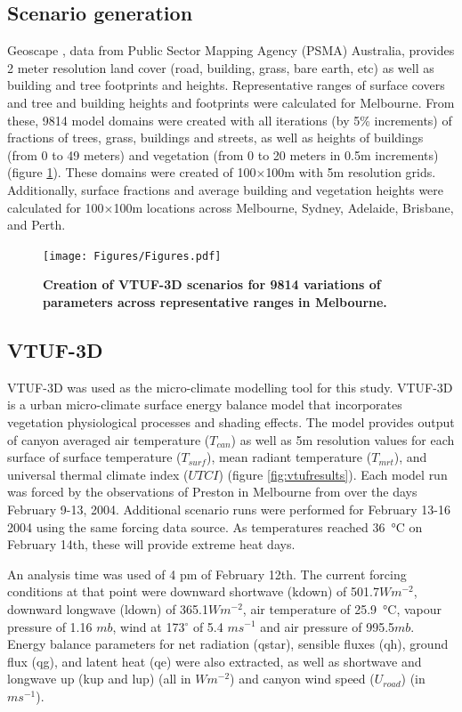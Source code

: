 \documentclass[final,3p,times,authoryear]{elsarticle}
\begin{document}
\subsection{Scenario generation}\label{sec:methodsgen}
Geoscape \citep{Geoscape2020}, data from Public Sector Mapping Agency (PSMA) Australia, provides 2 meter resolution land cover (road, building, grass, bare earth, etc) as well as building and tree footprints and heights. Representative ranges of surface covers and tree and building heights and footprints were calculated for Melbourne. From these, 9814 model domains were created with all iterations (by 5\% increments) of fractions of trees, grass, buildings and streets, as well as heights of buildings (from 0 to 49 meters) and vegetation (from 0 to 20 meters in 0.5m increments) (figure \ref{fig:scenarios}). These domains were created of 100$\times$100m with 5m resolution grids. Additionally, surface fractions and average building and vegetation heights were calculated for 100$\times$100m locations across Melbourne, Sydney, Adelaide, Brisbane, and Perth.


\begin{figure}
\centering
\texttt{[image: Figures/Figures.pdf]}
\caption{\bf Creation of VTUF-3D scenarios for 9814 variations of parameters across representative ranges in Melbourne.}
 \label{fig:scenarios}
\end{figure} 



\subsection{VTUF-3D}\label{sec:methodsvtuf}
VTUF-3D \citep{Nice2018a} was used as the micro-climate modelling tool for this study. VTUF-3D is a urban micro-climate surface energy balance model that incorporates vegetation physiological processes and shading effects. The model provides output of canyon averaged air temperature ($T_{can}$) as well as 5m resolution values for each surface of surface temperature ($T_{surf}$), mean radiant temperature ($T_{mrt}$), and universal thermal climate index ($UTCI$) (figure \ref{fig:vtufresults}). Each model run was forced by the observations of Preston in Melbourne from \cite{Coutts2007} over the days February 9-13, 2004. Additional scenario runs were performed for February 13-16 2004 using the same forcing data source. As temperatures reached 36\SI{}{\degreeCelsius} on February 14th, these will provide extreme heat days.

An analysis time was used of  4 pm of February 12th. The current forcing conditions at that point were downward shortwave (\gls{kdown}) of 501.7$Wm^{-2}$, downward longwave (\gls{ldown}) of 365.1$Wm^{-2}$, air temperature of 25.9\SI{}{\degreeCelsius}, vapour pressure of 1.16 $mb$, wind at 173$^{\circ}$ of 5.4 $ms^{-1}$ and air pressure of 995.5$mb$. Energy balance parameters for net radiation (\gls{qstar}), sensible fluxes (\gls{qh}), ground flux (\gls{qg}), and latent heat (\gls{qe}) were also extracted, as well as shortwave and longwave up (\gls{kup} and \gls{lup}) (all in $Wm^{-2}$) and canyon wind speed ($U_{road}$) (in $ms^{-1}$).
\end{document}

